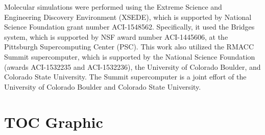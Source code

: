 \documentclass{article}
\begin{document}
  Molecular simulations were performed using the Extreme Science and
  Engineering Discovery Environment (XSEDE), which is supported by National
  Science Foundation grant number ACI-1548562. Specifically, it used the Bridges
  system, which is supported by NSF award number ACI-1445606, at the Pittsburgh
  Supercomputing Center (PSC). This work also utilized the RMACC Summit supercomputer,
  which is supported by the National Science Foundation (awards ACI-1532235 and
  ACI-1532236), the University of Colorado Boulder, and Colorado State
  University. The Summit supercomputer is a joint effort of the University of
  Colorado Boulder and Colorado State University.

  \clearpage

  
  

  \newpage

  \section*{TOC Graphic}
\end{document}
